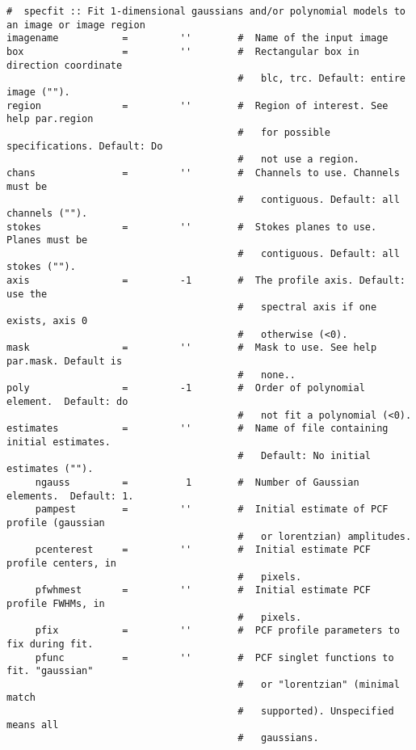 \small
\begin{verbatim}
#  specfit :: Fit 1-dimensional gaussians and/or polynomial models to an image or image region
imagename           =         ''        #  Name of the input image
box                 =         ''        #  Rectangular box in direction coordinate
                                        #   blc, trc. Default: entire image ("").
region              =         ''        #  Region of interest. See help par.region
                                        #   for possible specifications. Default: Do
                                        #   not use a region.
chans               =         ''        #  Channels to use. Channels must be
                                        #   contiguous. Default: all channels ("").
stokes              =         ''        #  Stokes planes to use. Planes must be
                                        #   contiguous. Default: all stokes ("").
axis                =         -1        #  The profile axis. Default: use the
                                        #   spectral axis if one exists, axis 0
                                        #   otherwise (<0).
mask                =         ''        #  Mask to use. See help par.mask. Default is
                                        #   none..
poly                =         -1        #  Order of polynomial element.  Default: do
                                        #   not fit a polynomial (<0).
estimates           =         ''        #  Name of file containing initial estimates.
                                        #   Default: No initial estimates ("").
     ngauss         =          1        #  Number of Gaussian elements.  Default: 1.
     pampest        =         ''        #  Initial estimate of PCF profile (gaussian
                                        #   or lorentzian) amplitudes.
     pcenterest     =         ''        #  Initial estimate PCF profile centers, in
                                        #   pixels.
     pfwhmest       =         ''        #  Initial estimate PCF profile FWHMs, in
                                        #   pixels.
     pfix           =         ''        #  PCF profile parameters to fix during fit.
     pfunc          =         ''        #  PCF singlet functions to fit. "gaussian"
                                        #   or "lorentzian" (minimal match
                                        #   supported). Unspecified means all
                                        #   gaussians.


\end{verbatim}
